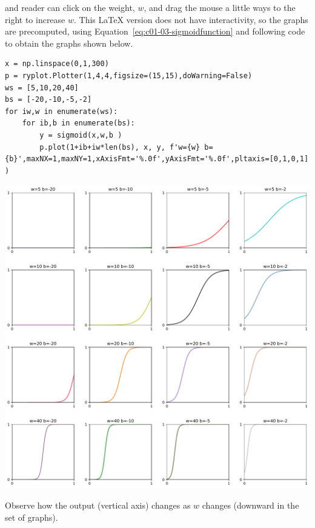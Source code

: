 and reader can click on the weight, $w$, and drag the mouse a little ways to the right to increase $w$. This \LaTeX{} version does not have interactivity, so the graphs are precomputed, using Equation~\ref{eq:c01-03-sigmoidfunction} and following code to obtain the graphs shown below.

\begin{lstlisting}
x = np.linspace(0,1,300)
p = ryplot.Plotter(1,4,4,figsize=(15,15),doWarning=False)
ws = [5,10,20,40]
bs = [-20,-10,-5,-2]
for iw,w in enumerate(ws):
    for ib,b in enumerate(bs):
        y = sigmoid(x,w,b )
        p.plot(1+ib+iw*len(bs), x, y, f'w={w} b={b}',maxNX=1,maxNY=1,xAxisFmt='%.0f',yAxisFmt='%.0f',pltaxis=[0,1,0,1] )
\end{lstlisting}

{\centering \includegraphics[width=\textwidth,]{eps/sigmoid4x4plot} \par}
Observe how the output (vertical axis) changes as $w$ changes (downward in the set of graphs).


